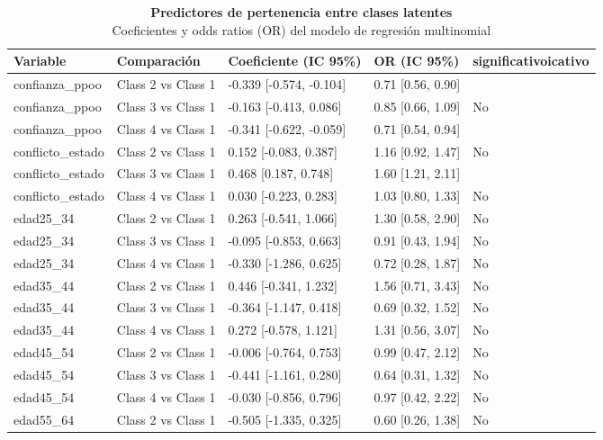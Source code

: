 \documentclass[
  letterpaper,
  DIV=11,
  numbers=noendperiod]{scrartcl}
\begin{document}
\begin{table}
{\caption*{
{\large \textbf{Predictores de pertenencia entre clases latentes}} \\ 
{\small Coeficientes y odds ratios (OR) del modelo de regresión multinomial}
} 
\fontsize{9.0pt}{10.8pt}\selectfont
\begin{tabular*}{\linewidth}{@{\extracolsep{\fill}}lllll}
\toprule
{\bfseries Variable} & Comparación & Coeficiente (IC 95\%) & OR (IC 95\%) & significativoicativo \\ 
\midrule\addlinespace[2.5pt]
confianza\_ppoo & Class 2 vs Class 1 & -0.339 [-0.574, -0.104] & 0.71 [0.56, 0.90] & {\cellcolor[HTML]{E6F4EA}{Sí (p < .05)}} \\ 
confianza\_ppoo & Class 3 vs Class 1 & -0.163 [-0.413, 0.086] & 0.85 [0.66, 1.09] & No \\ 
confianza\_ppoo & Class 4 vs Class 1 & -0.341 [-0.622, -0.059] & 0.71 [0.54, 0.94] & {\cellcolor[HTML]{E6F4EA}{Sí (p < .05)}} \\ 
conflicto\_estado & Class 2 vs Class 1 & 0.152 [-0.083, 0.387] & 1.16 [0.92, 1.47] & No \\ 
conflicto\_estado & Class 3 vs Class 1 & 0.468 [0.187, 0.748] & 1.60 [1.21, 2.11] & {\cellcolor[HTML]{E6F4EA}{Sí (p < .05)}} \\ 
conflicto\_estado & Class 4 vs Class 1 & 0.030 [-0.223, 0.283] & 1.03 [0.80, 1.33] & No \\ 
edad25\_34 & Class 2 vs Class 1 & 0.263 [-0.541, 1.066] & 1.30 [0.58, 2.90] & No \\ 
edad25\_34 & Class 3 vs Class 1 & -0.095 [-0.853, 0.663] & 0.91 [0.43, 1.94] & No \\ 
edad25\_34 & Class 4 vs Class 1 & -0.330 [-1.286, 0.625] & 0.72 [0.28, 1.87] & No \\ 
edad35\_44 & Class 2 vs Class 1 & 0.446 [-0.341, 1.232] & 1.56 [0.71, 3.43] & No \\ 
edad35\_44 & Class 3 vs Class 1 & -0.364 [-1.147, 0.418] & 0.69 [0.32, 1.52] & No \\ 
edad35\_44 & Class 4 vs Class 1 & 0.272 [-0.578, 1.121] & 1.31 [0.56, 3.07] & No \\ 
edad45\_54 & Class 2 vs Class 1 & -0.006 [-0.764, 0.753] & 0.99 [0.47, 2.12] & No \\ 
edad45\_54 & Class 3 vs Class 1 & -0.441 [-1.161, 0.280] & 0.64 [0.31, 1.32] & No \\ 
edad45\_54 & Class 4 vs Class 1 & -0.030 [-0.856, 0.796] & 0.97 [0.42, 2.22] & No \\ 
edad55\_64 & Class 2 vs Class 1 & -0.505 [-1.335, 0.325] & 0.60 [0.26, 1.38] & No \\ 

\end{tabular*}}
\end{table}
\end{document}

